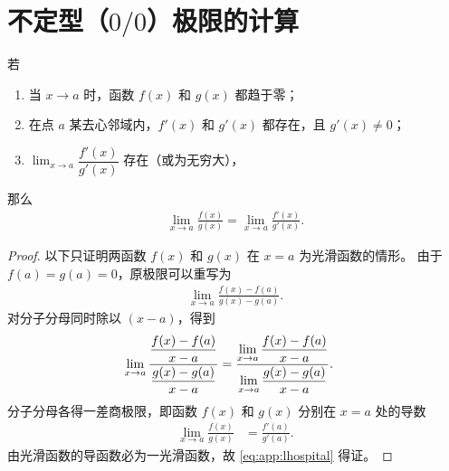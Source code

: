 
\chapter{不定型（$0/0$）极限的计算}
\begin{theorem}[L'Hospital法则]
  若
  \begin{enumerate}
  \item 当 $x \to a$ 时，函数 $f(x)$ 和 $g(x)$ 都趋于零；
  \item 在点 $a$ 某去心邻域内，$f'(x)$ 和 $g'(x)$ 都存在，且 $g'(x)\not= 0$；
  \item $\displaystyle\lim_{x \to a} \dfrac{f'(x)}{g'(x)}$ 存在（或为无穷大），
  \end{enumerate}
  那么
  \begin{align}
    \label{eq:app:lhospital}
    \lim_{x \to a} \frac{f(x)}{g(x)} = \lim_{x \to a} \frac{f'(x)}{g'(x)}.
  \end{align}
\end{theorem}
\begin{proof}
  以下只证明两函数 $f(x)$ 和 $g(x)$ 在 $x = a$ 为光滑函数的情形。
  由于 $f(a) = g(a) = 0$，原极限可以重写为
  \begin{align*}
    \lim_{x \to a} \frac{f(x) - f(a)}{g(x) - g(a)}.
  \end{align*}
  对分子分母同时除以 $(x - a)$，得到
  \begin{align*}
    \lim_{x \to a} \frac{%
      \dfrac{f(x) - f(a)}{x - a}
    }{%
      \dfrac{g(x) - g(a)}{x - a}
    } &
    = \frac{%
      \displaystyle\lim_{x \to a} \frac{f(x) - f(a)}{x - a}
    }{%
      \displaystyle\lim_{x \to a} \frac{g(x) - g(a)}{x - a}
    }.
  \end{align*}
  分子分母各得一差商极限，即函数 $f(x)$ 和 $g(x)$ 分别在 $x = a$ 处的导数
  \begin{align*}
    \lim_{x \to a} \frac{f(x)}{g(x)} &
    = \frac{f'(a)}{g'(a)}.
  \end{align*}
  由光滑函数的导函数必为一光滑函数，故 \eqref{eq:app:lhospital} 得证。
\end{proof}
